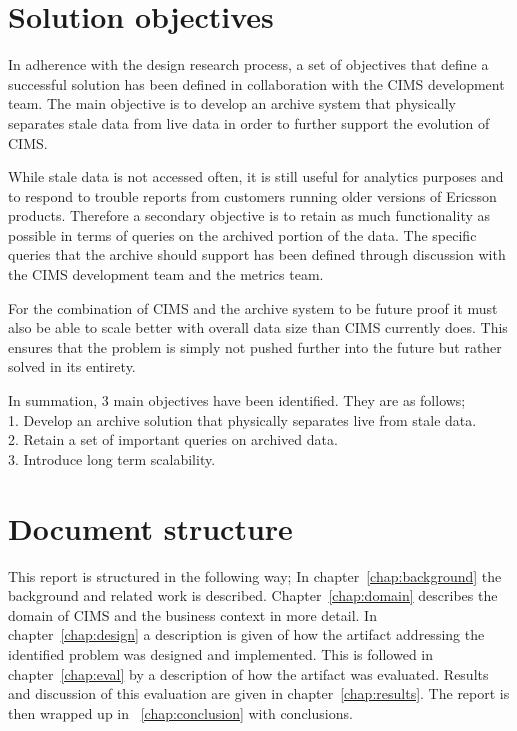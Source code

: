 \section{Solution objectives}
In adherence with the design research process, a set of objectives that define a successful solution has been defined in collaboration with the CIMS development team. The main objective is to develop an archive system that physically separates stale data from live data in order to further support the evolution of CIMS.

While stale data is not accessed often, it is still useful for analytics purposes and to respond to trouble reports from customers running older versions of Ericsson products. Therefore a secondary objective is to retain as much functionality as possible in terms of queries on the archived portion of the data. The specific queries that the archive should support has been defined through discussion with the CIMS development team and the metrics team.

For the combination of CIMS and the archive system to be future proof it must also be able to scale better with overall data size than CIMS currently does. This ensures that the problem is simply not pushed further into the future but rather solved in its entirety.

In summation, 3 main objectives have been identified. They are as follows;\\
1. Develop an archive solution that physically separates live from stale data.\\
2. Retain a set of important queries on archived data.\\
3. Introduce long term scalability. \\


\section{Document structure}
This report is structured in the following way; In chapter~\ref{chap:background} the background and related work is described. Chapter~\ref{chap:domain} describes the domain of CIMS and the business context in more detail. In chapter~\ref{chap:design} a description is given of how the artifact addressing the identified problem was designed and implemented.
This is followed in chapter~\ref{chap:eval} by a description of how the artifact was evaluated. Results and discussion of this evaluation are given in chapter~\ref{chap:results}. The report is then wrapped up in ~\ref{chap:conclusion} with conclusions.

